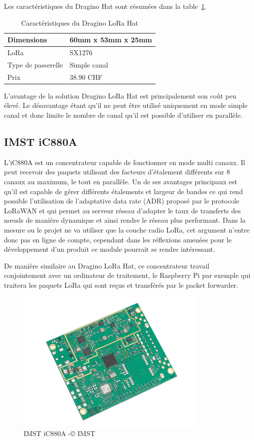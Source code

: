 Les caractéristiques du Dragino Hat sont résumées dans la table~\ref{tab:dragino_cara}.

\begin{table}[htb]
\caption[Dragino Hat Caractéristiques]{Caractéristiques du Dragino LoRa Hat}
\label{tab:dragino_cara}
\centering
\begin{tabular}{ l | l }
\toprule
Dimensions & 60mm x 53mm x 25mm \\
\midrule
LoRa & SX1276 \\
\midrule
Type de passerelle & Simple canal \\
\midrule
Prix & 38.90 CHF \\
\bottomrule
\end{tabular}
\end{table}

L’avantage de la solution Dragino LoRa Hat est principalement son coût peu élevé. Le désavantage étant qu’il ne peut être utilisé uniquement en mode simple canal et donc limite le nombre de canal qu’il est possible d’utiliser en parallèle.

\subsection {IMST iC880A}

L’iC880A est un concentrateur capable de fonctionner en mode multi canaux. Il peut recevoir des paquets utilisant des facteurs d’étalement différents sur 8 canaux au maximum, le tout en parallèle. Un de ses avantages principaux est qu’il est capable de gérer différents étalements et largeur de bandes ce qui rend possible l’utilisation de l’adaptative data rate (ADR) proposé par le protocole LoRaWAN et qui permet au serveur réseau d’adapter le taux de transferts des nœuds de manière dynamique et ainsi rendre le réseau plus performant. Dans la mesure ou le projet ne va utiliser que la couche radio LoRa, cet argument n’entre donc pas en ligne de compte, cependant dans les réflexions amenées pour le développement d'un produit ce module pourrait se rendre intéressant.

De manière similaire au Dragino LoRa Hat, ce concentrateur travail conjointement avec un ordinateur de traitement, le Raspberry Pi par exemple qui traitera les paquets LoRa qui sont reçus et transférés par le packet forwarder.

\begin{figure}[htb]
\centering 
\includegraphics[width=0.5\columnwidth]{../images/iC880A.png} 
\caption[IMST iC880A]{IMST iC880A -© IMST}
\label{fig:imst_ic880a}
\end{figure}

